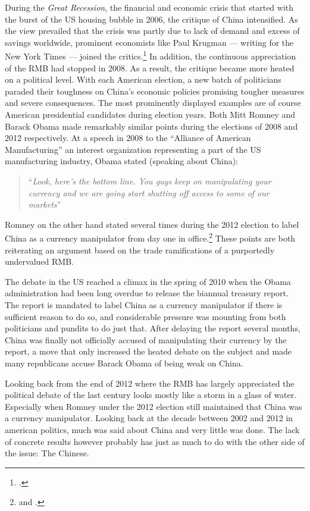 During the \emph{Great Recession}, the financial and economic crisis 
that started with the burst of the US housing bubble in 2006, the 
critique of China intensified. As the view prevailed that the crisis was 
partly due to lack of demand and excess of savings worldwide, prominent 
economists like Paul Krugman --- writing for the New York Times --- 
joined the critics.\footnote{\cite{Krugman2009}.} In addition, the 
continuous appreciation of the RMB had stopped in 2008. As a result, the 
critique became more heated on a political level. With each American 
election, a new batch of politicians paraded their toughness on China's 
economic policies promising tougher measures and severe consequences.  
The most prominently displayed examples are of course American 
presidential candidates during election years.  Both Mitt Romney and 
Barack Obama made remarkably similar points during the elections of 2008 
and 2012 respectively. At a speech in 2008 to the ``Alliance of American 
Manufacturing'' an interest organization representing a part of the US 
manufacturing industry, Obama stated (speaking about China): 
\begin{quotation}``\emph{Look, here's the bottom line.  You guys keep on 
	manipulating your currency and we are going start shutting off 
access to some of our markets}''
\end{quotation}Romney on the other hand stated several times during the 
2012 election to label China as a currency manipulator from day one in 
office.\footnote{\cite{Obama2008} and \cite{Romney2012}.} These points 
are both reiterating an argument based on the trade ramifications of a 
purportedly undervalued RMB.

The debate in the US reached a climax in the spring of 2010 when the 
Obama administration had been long overdue to release the biannual 
treasury report. The report is mandated to label China as a currency 
manipulator if there is sufficient reason to do so, and considerable 
pressure was mounting from both politicians and pundits to do just that.  
After delaying the report several months, China was finally not 
officially accused of manipulating their currency by the report, a move 
that only increased the heated debate on the subject and made many 
republicans accuse Barack Obama of being weak on China.

Looking back from the end of 2012 where the RMB has largely appreciated 
the political debate of the last century looks mostly like a storm in a 
glass of water. Especially when Romney under the 2012 election still 
maintained that China was a currency manipulator. Looking back at the 
decade between 2002 and 2012 in american politics, much was said about 
China and very little was done.  The lack of concrete results however 
probably has just as much to do with the other side of the issue: The 
Chinese.

